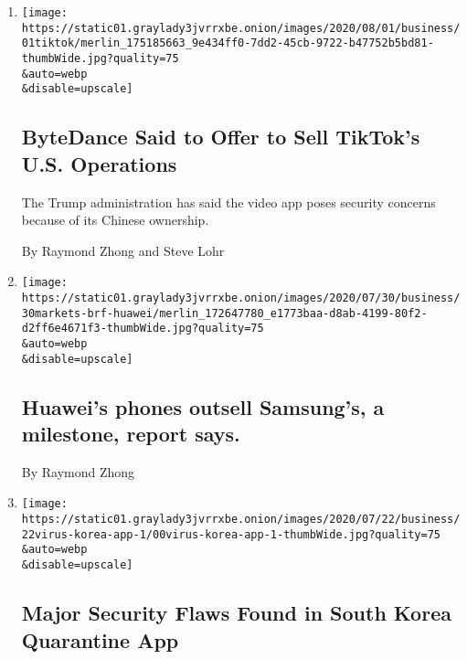 \begin{enumerate}
\def\labelenumi{\arabic{enumi}.}
\item
  \href{/2020/08/01/technology/tiktok-sale-trump-ban.html}{}

  \texttt{[image: https://static01.graylady3jvrrxbe.onion/images/2020/08/01/business/01tiktok/merlin\_175185663\_9e434ff0-7dd2-45cb-9722-b47752b5bd81-thumbWide.jpg?quality=75\\\&auto=webp\\\&disable=upscale]}

  \hypertarget{bytedance-said-to-offer-to-sell-tiktoks-us-operations}{%
  \subsection{ByteDance Said to Offer to Sell TikTok's U.S.
  Operations}\label{bytedance-said-to-offer-to-sell-tiktoks-us-operations}}

  The Trump administration has said the video app poses security
  concerns because of its Chinese ownership.

  By Raymond Zhong and Steve Lohr
\item
  \href{/2020/07/30/business/huaweis-phones-outsell-samsungs-a-milestone-report-says.html}{}

  \texttt{[image: https://static01.graylady3jvrrxbe.onion/images/2020/07/30/business/30markets-brf-huawei/merlin\_172647780\_e1773baa-d8ab-4199-80f2-d2ff6e4671f3-thumbWide.jpg?quality=75\\\&auto=webp\\\&disable=upscale]}

  \hypertarget{huaweis-phones-outsell-samsungs-a-milestone-report-says}{%
  \subsection{Huawei's phones outsell Samsung's, a milestone, report
  says.}\label{huaweis-phones-outsell-samsungs-a-milestone-report-says}}

  By Raymond Zhong
\item
  \href{/2020/07/21/technology/korea-coronavirus-app-security.html}{}

  \texttt{[image: https://static01.graylady3jvrrxbe.onion/images/2020/07/22/business/22virus-korea-app-1/00virus-korea-app-1-thumbWide.jpg?quality=75\\\&auto=webp\\\&disable=upscale]}

  \hypertarget{major-security-flaws-found-in-south-korea-quarantine-app}{%
  \subsection{Major Security Flaws Found in South Korea Quarantine
  App}\label{major-security-flaws-found-in-south-korea-quarantine-app}}


\end{enumerate}
